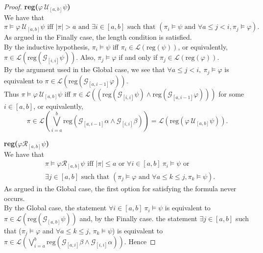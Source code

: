 \documentclass[runningheads]{llncs}
\begin{document}
\begin{proof}
 \noindent \textbf{reg($\varphi \ \mathcal{U}_{[a,b]} \psi$)}\\
  We have that 
  $$\pi \vDash \varphi \ \mathcal{U}_{[a,b]} \psi \text{ iff } |\pi| > a \text{ and } \exists i \in [a,b] \text{ such that } (\pi_i \vDash \psi \text{ and } \forall a \leq j < i, \pi_j \vDash \varphi).$$
  As argued in the Finally case, the length condition is satisfied.\\
  By the inductive hypothesis, $\pi_i \vDash \psi$ iff $\pi_i \in \mathscr{L}(\text{reg}(\psi))$, or equivalently, \\
  $\pi \in \mathscr{L}(\text{reg}(\mathcal{G}_{[i,i]} \psi))$. Also, $\pi_j \vDash \varphi$ if and only if $\pi_j \in \mathscr{L}(\text{reg}(\varphi))$.\\
  By the argument used in the Global case, we see that $\forall a \leq j < i, \ \pi_j \vDash \varphi$ is equivalent to $\pi \in \mathscr{L}(\text{reg}(\mathcal{G}_{[a, i-1]} \varphi))$.\\
  Thus $\pi \vDash \varphi \ \mathcal{U}_{[a,b]} \psi$ iff $\pi \in \mathscr{L}((\text{reg}(\mathcal{G}_{[i,i]} \psi) \land \text{reg}( \mathcal{G}_{[a, i-1]} \varphi)))$ for some $i \in [a,b]$, or equivalently, 
  $$\pi \in \mathscr{L}\left(\bigvee_{i=a}^{b} \text{reg}\left(\mathcal{G}_{[a,i-1]}\alpha \land \mathcal{G}_{[i, i]} \beta\right)\right) = \mathscr{L}\left(\text{reg}(\varphi \ \mathcal{U}_{[a,b]} \psi)\right).$$
  
  \noindent \textbf{reg($\varphi \mathcal{R}_{[a,b]} \psi$)}\\
  We have that
  \begin{align*}
    &\pi \vDash \varphi \mathcal{R}_{[a,b]} \psi \text{ iff } |\pi| \leq a \text{ or } \forall i \in [a,b] \ \pi_i \vDash \psi \text{ or } \\ 
    &\exists j\in[a,b] \text{ such that }
    (\pi_j \vDash \varphi \text{ and } \forall a\leq k \leq j, \pi_k \vDash \psi).
  \end{align*}
  As argued in the Global case, the first option for satisfying the formula never occurs.\\
  By the Global case, the statement $\forall i\in[a,b] \ \pi_i \vDash \psi$ is equivalent to $\pi \in \mathscr{L}(\text{reg}(\mathcal{G}_{[a,b]} \psi))$ and, by the Finally case. the statement $\exists j\in[a,b]$ such that ($\pi_j \vDash \varphi$ and $\forall a\leq k \leq j$, $\pi_k \vDash \psi$) is equivalent to $\pi \in \mathscr{L}\left(\bigvee_{i=a}^{b} \text{reg}\left(\mathcal{G}_{[a,i]}\beta \land \mathcal{G}_{[i, i]} \alpha\right)\right)$. Hence 
  

\end{proof}
\end{document}
